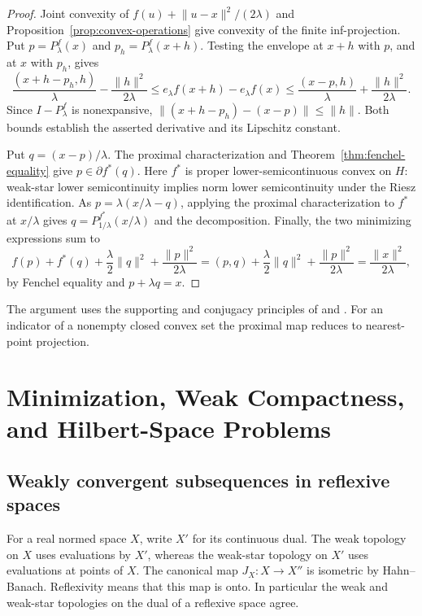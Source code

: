 \documentclass[11pt,oneside,openany]{book}
\theoremstyle{plain}
\theoremstyle{definition}
\theoremstyle{remark}
\begin{document}
\begin{proof}
Joint convexity of \(f(u)+\lVert u-x\rVert^2/(2\lambda)\)
and Proposition~\ref{prop:convex-operations} give convexity
of the finite inf-projection. Put \(p=P_\lambda^f(x)\) and
\(p_h=P_\lambda^f(x+h)\).
Testing the envelope at \(x+h\) with \(p\), and at \(x\)
with \(p_h\), gives
\[
 \frac{(x+h-p_h,h)}{\lambda}
      -\frac{\lVert h\rVert^2}{2\lambda}
 \le e_\lambda f(x+h)-e_\lambda f(x)
 \le \frac{(x-p,h)}{\lambda}
      +\frac{\lVert h\rVert^2}{2\lambda}.
\]
Since \(I-P_\lambda^f\) is nonexpansive,
\(\lVert(x+h-p_h)-(x-p)\rVert\le\lVert h\rVert\).
Both bounds establish the asserted derivative and its
Lipschitz constant.

Put \(q=(x-p)/\lambda\).
The proximal characterization and
Theorem~\ref{thm:fenchel-equality} give \(p\in\partial f^*(q)\).
Here \(f^*\) is proper lower-semicontinuous convex on \(H\):
weak-star lower semicontinuity implies norm lower
semicontinuity under the Riesz identification.
As \(p=\lambda(x/\lambda-q)\), applying the proximal
characterization to \(f^*\) at \(x/\lambda\) gives
\(q=P_{1/\lambda}^{f^*}(x/\lambda)\) and the decomposition.
Finally, the two minimizing expressions sum to
\[
 f(p)+f^*(q)+\frac{\lambda}{2}\lVert q\rVert^2
        +\frac{\lVert p\rVert^2}{2\lambda}
 = (p,q)+\frac{\lambda}{2}\lVert q\rVert^2
        +\frac{\lVert p\rVert^2}{2\lambda}
 = \frac{\lVert x\rVert^2}{2\lambda},
\]
by Fenchel equality and \(p+\lambda q=x\).
\end{proof}

The argument uses the supporting and conjugacy principles of
\cite[\S\S12 and 23--24]{Rockafellar} and
\cite[Chapter I, \S5]{EkelandTemam}. For an indicator of a nonempty
closed convex set the proximal map reduces to nearest-point projection.
\chapter{Minimization, Weak Compactness, and Hilbert-Space Problems}

\section{Weakly convergent subsequences in reflexive spaces}
\label{v03-01}

For a real normed space \(X\), write \(X'\) for its continuous dual.
The weak topology on \(X\) uses evaluations by \(X'\), whereas the weak-star
topology on \(X'\) uses evaluations at points of \(X\). The canonical map
\(J_X:X\to X''\) is isometric by Hahn--Banach. Reflexivity means that this
map is onto. In particular the weak and weak-star topologies on the dual
of a reflexive space agree.
\end{document}
